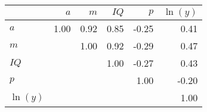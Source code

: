 \begin{tabular}{lrrrrr}
\hline
 & $a$  & $m$  & $IQ$  & $p$  & $\ln(y)$  \\
\hline
$a$ & 1.00  & 0.92  & 0.85  & -0.25  & 0.41  \\
$m$ &   & 1.00  & 0.92  & -0.29  & 0.47  \\
$IQ$ &   &   & 1.00  & -0.27  & 0.43  \\
$p$ &   &   &   & 1.00  & -0.20  \\
$\ln(y)$ &   &   &   &   & 1.00  \\
\hline
\end{tabular}%
